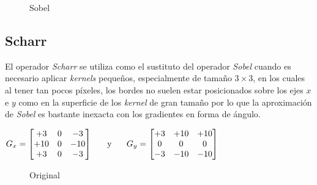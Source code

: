 \begin{figure}[H]
  \centering \setlength\fboxsep{0pt} \setlength\fboxrule{0.5pt}
  \caption{Sobel}
\end{figure}

\subsection{Scharr}
El operador \emph{Scharr} se utiliza como el sustituto del operador
\emph{Sobel} cuando es necesario aplicar \emph{kernels} pequeños,
especialmente de tamaño $3 \times 3$, en los cuales al tener tan pocos
píxeles, los bordes no suelen estar posicionados sobre los ejes $x$ e
$y$ como en la superficie de los \emph{kernel} de gran tamaño por lo
que la aproximación de \emph{Sobel} es bastante inexacta con los
gradientes en forma de ángulo.
\begin{center}
  $ G_x = \begin{bmatrix}
    +3 & 0 & -3 \\
    +10 & 0 & -10 \\
    +3 & 0 & -3 \\
  \end{bmatrix}
  \hspace{0.5cm} \text{ y } \hspace{0.5cm} G_y = \begin{bmatrix}
    +3 & +10 & +10 \\
    0 & 0 & 0 \\
    -3 & -10 & -10 \\
  \end{bmatrix}
  $
\end{center}

\begin{figure}[H]
  \caption{Original}
  \centering \setlength\fboxsep{0pt} \setlength\fboxrule{0.5pt}
\end{figure}

